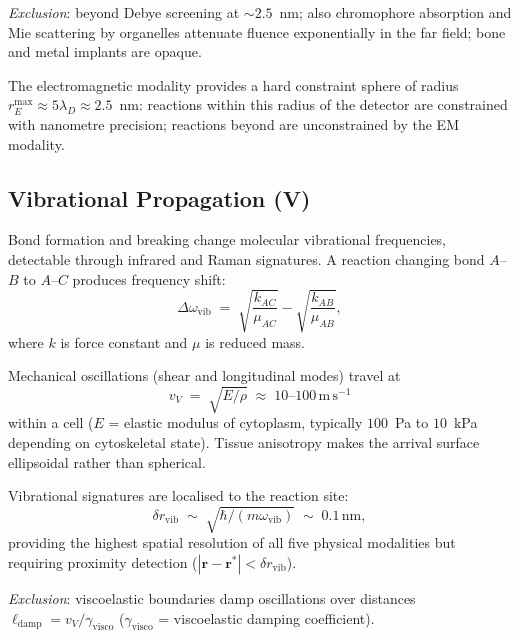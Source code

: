 \emph{Exclusion}: beyond Debye screening at $\sim 2.5$~nm; also chromophore
absorption and Mie scattering by organelles attenuate fluence exponentially
in the far field; bone and metal implants are opaque.

\begin{theorem}
\label{thm:em-sphere}
The electromagnetic modality provides a hard constraint sphere of radius
$r_E^\mathrm{max} \approx 5\lambda_D \approx 2.5$~nm: reactions within this
radius of the detector are constrained with nanometre precision; reactions
beyond are unconstrained by the EM modality.
\end{theorem}

\subsection{Vibrational Propagation (V)}

Bond formation and breaking change molecular vibrational frequencies,
detectable through infrared and Raman signatures.  A reaction changing bond
$A$--$B$ to $A$--$C$ produces frequency shift:
\begin{equation}
    \Delta\omega_\mathrm{vib}
    \;=\; \sqrt{\frac{k_{AC}}{\mu_{AC}}} - \sqrt{\frac{k_{AB}}{\mu_{AB}}},
\end{equation}
where $k$ is force constant and $\mu$ is reduced mass.

Mechanical oscillations (shear and longitudinal modes) travel at
\begin{equation}
  v_V \;=\; \sqrt{E/\rho} \;\approx\; 10\text{--}100\,\mathrm{m\,s^{-1}}
  \label{eq:vV}
\end{equation}
within a cell ($E$ = elastic modulus of cytoplasm, typically $100$~Pa
to $10$~kPa depending on cytoskeletal state).  Tissue anisotropy makes the
arrival surface ellipsoidal rather than spherical.

\begin{proposition}
Vibrational signatures are localised to the reaction site:
\begin{equation}
    \delta r_\mathrm{vib}
    \;\sim\; \sqrt{\hbar/(m\omega_\mathrm{vib})}
    \;\sim\; 0.1\,\mathrm{nm},
\end{equation}
providing the highest spatial resolution of all five physical modalities but
requiring proximity detection ($|\mathbf{r} - \mathbf{r}^*| < \delta r_\mathrm{vib}$).
\end{proposition}

\emph{Exclusion}: viscoelastic boundaries damp oscillations over distances
$\ell_\mathrm{damp} = v_V/\gamma_\mathrm{visco}$ ($\gamma_\mathrm{visco}$
= viscoelastic damping coefficient).


